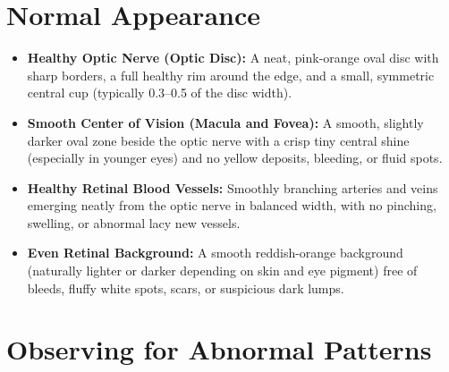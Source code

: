 \section{Normal Appearance}

\begin{itemize}
    \item \textbf{Healthy Optic Nerve (Optic Disc):} A neat, pink-orange oval disc with sharp borders, a full healthy rim around the edge, and a small, symmetric central cup (typically 0.3--0.5 of the disc width).
    \item \textbf{Smooth Center of Vision (Macula and Fovea):} A smooth, slightly darker oval zone beside the optic nerve with a crisp tiny central shine (especially in younger eyes) and no yellow deposits, bleeding, or fluid spots.
    \item \textbf{Healthy Retinal Blood Vessels:} Smoothly branching arteries and veins emerging neatly from the optic nerve in balanced width, with no pinching, swelling, or abnormal lacy new vessels.
    \item \textbf{Even Retinal Background:} A smooth reddish-orange background (naturally lighter or darker depending on skin and eye pigment) free of bleeds, fluffy white spots, scars, or suspicious dark lumps.
\end{itemize}

\section{Observing for Abnormal Patterns}

